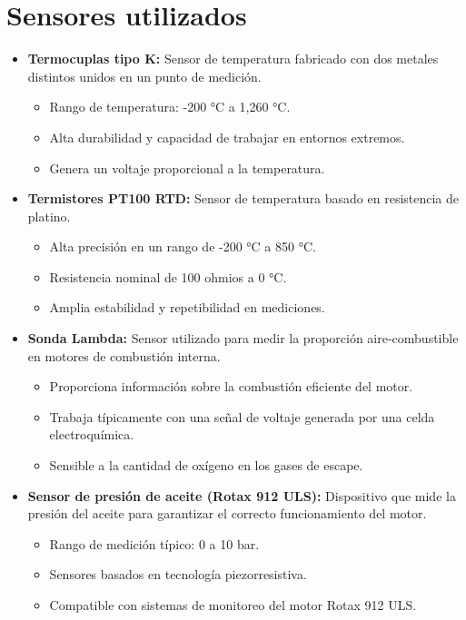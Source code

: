 \section{Sensores utilizados}

\begin{itemize}
    \item \textbf{Termocuplas tipo K:}  
    Sensor de temperatura fabricado con dos metales distintos unidos en un punto de medición.  
    \begin{itemize}
        \item Rango de temperatura: -200 °C a 1,260 °C.  
        \item Alta durabilidad y capacidad de trabajar en entornos extremos.  
        \item Genera un voltaje proporcional a la temperatura.  
    \end{itemize}

    \item \textbf{Termistores PT100 RTD:}  
    Sensor de temperatura basado en resistencia de platino.  
    \begin{itemize}
        \item Alta precisión en un rango de -200 °C a 850 °C.  
        \item Resistencia nominal de 100 ohmios a 0 °C.  
        \item Amplia estabilidad y repetibilidad en mediciones.  
    \end{itemize}

    \item \textbf{Sonda Lambda:}  
    Sensor utilizado para medir la proporción aire-combustible en motores de combustión interna.  
    \begin{itemize}
        \item Proporciona información sobre la combustión eficiente del motor.  
        \item Trabaja típicamente con una señal de voltaje generada por una celda electroquímica.  
        \item Sensible a la cantidad de oxígeno en los gases de escape.  
    \end{itemize}

    \item \textbf{Sensor de presión de aceite (Rotax 912 ULS):}  
    Dispositivo que mide la presión del aceite para garantizar el correcto funcionamiento del motor.  
    \begin{itemize}
        \item Rango de medición típico: 0 a 10 bar.  
        \item Sensores basados en tecnología piezorresistiva.  
        \item Compatible con sistemas de monitoreo del motor Rotax 912 ULS.  
    \end{itemize}


\end{itemize}
